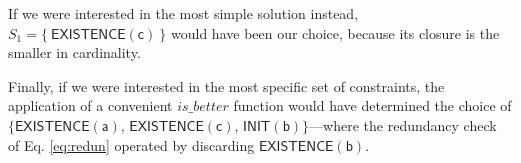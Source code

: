 \begin{example}
If we were interested in the most simple solution instead, $S_1=\{\ \mathsf{EXISTENCE(c)}\ \}$ would have been our choice, because its closure is the smaller in cardinality.

Finally, if we were interested in the most specific set of constraints, the application of a convenient ${is\_better}$ function would have determined the choice of $\{\mathsf{EXISTENCE(a)}$, $\mathsf{EXISTENCE(c)}$, $\mathsf{INIT(b)}\}$---where the redundancy check of Eq. \eqref{eq:redun} operated by discarding $\mathsf{EXISTENCE(b)}$. 
\end{example}

%
%

%

%


%
%
%
%



